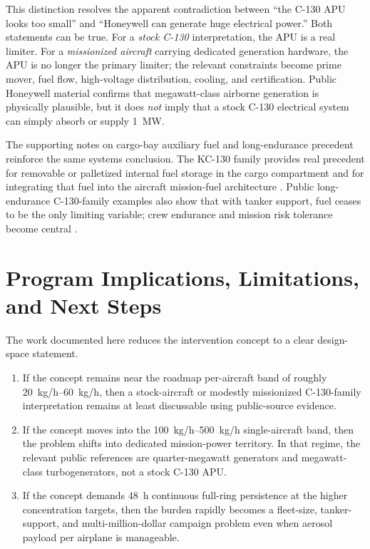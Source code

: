 \documentclass[8pt,twocolumn]{extarticle}
\begin{document}
\vspace{0.25em}
This distinction resolves the apparent contradiction between ``the C-130 APU looks too small'' and ``Honeywell can generate huge electrical power.'' Both statements can be true. For a \emph{stock C-130} interpretation, the APU is a real limiter. For a \emph{missionized aircraft} carrying dedicated generation hardware, the APU is no longer the primary limiter; the relevant constraints become prime mover, fuel flow, high-voltage distribution, cooling, and certification. Public Honeywell material confirms that megawatt-class airborne generation is physically plausible, but it does \emph{not} imply that a stock C-130 electrical system can simply absorb or supply \SI{1}{MW}.

\vspace{0.25em}
The supporting notes on cargo-bay auxiliary fuel and long-endurance precedent reinforce the same systems conclusion. The KC-130 family provides real precedent for removable or palletized internal fuel storage in the cargo compartment and for integrating that fuel into the aircraft mission-fuel architecture \citep{AeolusInternalFuelNote,LockheedKC130Offload}. Public long-endurance C-130-family examples also show that with tanker support, fuel ceases to be the only limiting variable; crew endurance and mission risk tolerance become central \citep{AeolusRefuelEndurance}.

\section*{Program Implications, Limitations, and Next Steps}

The work documented here reduces the intervention concept to a clear design-space statement.
\begin{enumerate}[leftmargin=1.1em,itemsep=0.15em]
\item If the concept remains near the roadmap per-aircraft band of roughly \SIrange{20}{60}{kg/h}, then a stock-aircraft or modestly missionized C-130-family interpretation remains at least discussable using public-source evidence.
\item If the concept moves into the \SIrange{100}{500}{kg/h} single-aircraft band, then the problem shifts into dedicated mission-power territory. In that regime, the relevant public references are quarter-megawatt generators and megawatt-class turbogenerators, not a stock C-130 APU.
\item If the concept demands \SI{48}{h} continuous full-ring persistence at the higher concentration targets, then the burden rapidly becomes a fleet-size, tanker-support, and multi-million-dollar campaign problem even when aerosol payload per airplane is manageable.
\end{enumerate}
\end{document}
